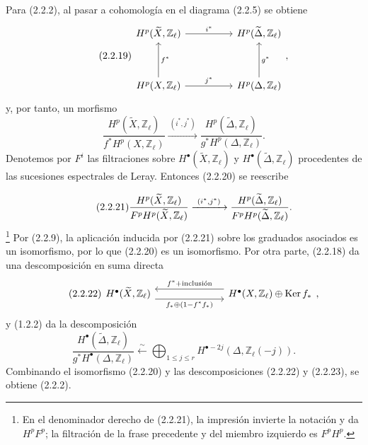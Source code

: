 Para (2.2.2), al pasar a cohomología en el diagrama (2.2.5) se obtiene
\begin{equation}\tag{2.2.19}
\begin{tikzcd}[row sep=huge,column sep=huge]
H^p(\widetilde X,\mathbb Z_\ell)
  \arrow[r,"i^*"]
&
H^p(\widetilde\Delta,\mathbb Z_\ell)
\\
H^p(X,\mathbb Z_\ell)
  \arrow[r,"j^*"]
  \arrow[u,"f^*"']
&
H^p(\Delta,\mathbb Z_\ell)
  \arrow[u,"g^*"']
\end{tikzcd},
\end{equation}
y, por tanto, un morfismo
\begin{equation}\tag{2.2.20}
\frac{H^p(\widetilde X,\mathbb Z_\ell)}
     {f^*H^p(X,\mathbb Z_\ell)}
\xrightarrow{\ (i^*,j^*)\ }
\frac{H^p(\widetilde\Delta,\mathbb Z_\ell)}
     {g^*H^p(\Delta,\mathbb Z_\ell)}.
\end{equation}
Denotemos por $F^i$ las filtraciones sobre
$H^\bullet(\widetilde X,\mathbb Z_\ell)$ y
$H^\bullet(\widetilde\Delta,\mathbb Z_\ell)$ procedentes de las
sucesiones espectrales de Leray. Entonces (2.2.20) se reescribe

\pageoriginale

\begin{equation}\tag{2.2.21}
\frac{H^p(\widetilde X,\mathbb Z_\ell)}
     {F^pH^p(\widetilde X,\mathbb Z_\ell)}
\xrightarrow{\ (i^*,j^*)\ }
\frac{H^p(\widetilde\Delta,\mathbb Z_\ell)}
     {\sisi{H^pF^p}{F^pH^p}(\widetilde\Delta,\mathbb Z_\ell)}.
\end{equation}
\footnote{En el denominador derecho de (2.2.21), la impresión invierte
la notación y da $H^pF^p$; la filtración de la frase precedente y del
miembro izquierdo es $F^pH^p$.}
Por (2.2.9), la aplicación inducida por (2.2.21) sobre los graduados
asociados es un isomorfismo, por lo que (2.2.20) es un isomorfismo.
Por otra parte, (2.2.18) da una descomposición en suma directa
\begin{equation}\tag{2.2.22}
\begin{tikzcd}[column sep=7em]
H^\bullet(\widetilde X,\mathbb Z_\ell)
  \arrow[r,shift right=1.2ex,
    "f_*\oplus(1-f^*f_*)"']
&
H^\bullet(X,\mathbb Z_\ell)\oplus\operatorname{Ker} f_*
  \arrow[l,shift right=1.2ex,
    "f^*+\text{inclusión}"']
\end{tikzcd},
\end{equation}
y (1.2.2) da la descomposición
\begin{equation}\tag{2.2.23}
\frac{H^\bullet(\widetilde\Delta,\mathbb Z_\ell)}
     {g^*H^\bullet(\Delta,\mathbb Z_\ell)}
\xleftarrow{\ \sim\ }
\bigoplus_{1\leq j\leq r}
H^{\bullet-2j}(\Delta,\mathbb Z_\ell(-j)).
\end{equation}
Combinando el isomorfismo (2.2.20) y las descomposiciones (2.2.22) y
(2.2.23), se obtiene (2.2.2).

